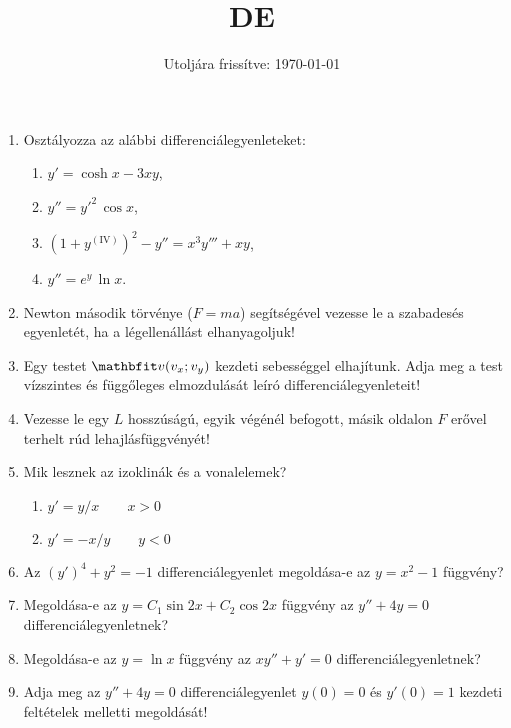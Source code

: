 \documentclass{szb-practice}
\title{DE}
\date{Utoljára frissítve: \today}
\begin{document}
\begin{enumerate}
  \item Osztályozza az alábbi differenciálegyenleteket:
        \begin{multicols}{2}
          \begin{enumerate}
            \item $y' = \cosh x - 3xy$,
            \item $y'' = y'^2 \, \cos x$,
            \item $\left( 1 + y^{(\mathrm{IV})} \right)^2 - y'' = x^3 y''' + xy$,
            \item $y'' = e^y \, \ln x$.
          \end{enumerate}
        \end{multicols}

  \item Newton második törvénye ($F = ma$) segítségével vezesse le a
        szabadesés egyenletét, ha a légellenállást elhanyagoljuk!

  \item Egy testet $\rvec v(v_x; v_y)$ kezdeti sebességgel elhajítunk. Adja
        meg a test vízszintes és függőleges elmozdulását leíró
        differenciálegyenleteit!

  \item Vezesse le egy $L$ hosszúságú, egyik végénél befogott, másik oldalon
        $F$ erővel terhelt rúd lehajlásfüggvényét!

  \item Mik lesznek az izoklinák és a vonalelemek?
        \begin{enumerate}
          \item $y' = y / x \qquad x > 0$
          \item $y' = -x / y \qquad y < 0$
        \end{enumerate}

  \item Az $(y')^4 + y^2 = -1$ differenciálegyenlet megoldása-e az
        $y = x^2 - 1$ függvény?

  \item Megoldása-e az $y = C_1 \sin 2x + C_2 \cos 2x$ függvény az
        $y'' + 4y = 0$ differenciálegyenletnek?

  \item Megoldása-e az $y = \ln x$ függvény az $xy'' + y' = 0$
        differenciálegyenletnek?

  \item Adja meg az $y'' + 4y = 0$ differenciálegyenlet $y(0) = 0$ és
        $y'(0) = 1$ kezdeti feltételek melletti megoldását!


\end{enumerate}
\end{document}
